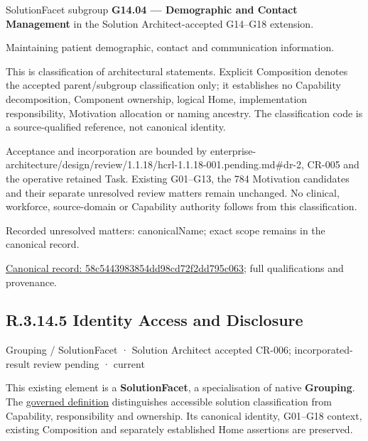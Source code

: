 SolutionFacet subgroup \textbf{G14.04 — Demographic and Contact Management} in the Solution Architect-accepted G14–G18 extension.



Maintaining patient demographic, contact and communication information.



This is classification of architectural statements. Explicit Composition denotes the accepted parent/subgroup classification only; it establishes no Capability decomposition, Component ownership, logical Home, implementation responsibility, Motivation allocation or naming ancestry. The classification code is a source-qualified reference, not canonical identity.



Acceptance and incorporation are bounded by enterprise-architecture/design/review/1.1.18/hcrl-1.1.18-001.pending.md\#dr-2, CR-005 and the operative retained Task. Existing G01–G13, the 784 Motivation candidates and their separate unresolved review matters remain unchanged. No clinical, workforce, source-domain or Capability authority follows from this classification.


{\small Recorded unresolved matters: canonicalName; exact scope remains in the canonical record.}\par
{\footnotesize \href{../../../../../../../continuum/grouping/58c5443983854dd98cd72f2dd795c063.md}{Canonical record: 58c5443983854dd98cd72f2dd795c063}; full qualifications and provenance.}\par
\subsection*{R.3.14.5 Identity Access and Disclosure}
\label{navigation:R.3.14.5}

\label{element:2f97190ae5734e8caee48d581e1a6ab2}
{\small Grouping / SolutionFacet · Solution Architect accepted CR-006; incorporated-result review pending · current}\par

This existing element is a \textbf{SolutionFacet}, a specialisation of native
\textbf{Grouping}. The \href{\detokenize{../../../../../../../governance/continuum-representation.md#solutionfacet-classification--1119-candidate}}{governed definition}
distinguishes accessible solution classification from Capability, responsibility
and ownership. Its canonical identity, G01–G18 context, existing Composition
and separately established Home assertions are preserved.



